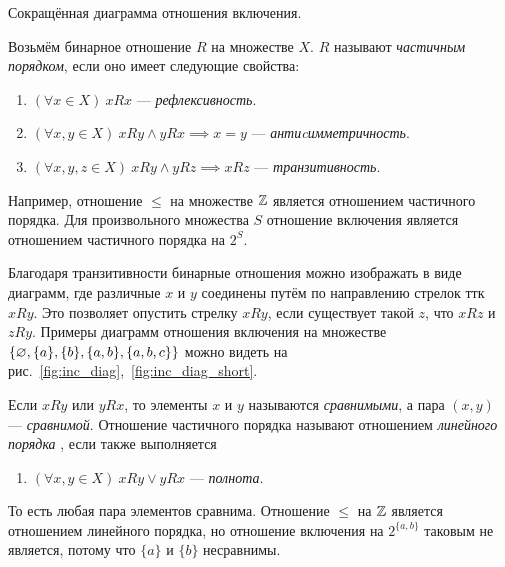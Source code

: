 \begin{marginfigure}
	\center

	\caption{Сокращённая диаграмма отношения включения.}\label{fig:inc_diag_short}
\end{marginfigure}

Возьмём бинарное отношение $R$ на множестве $X$. $R$ называют
{\it частичным порядком},
если оно имеет следующие свойства:
\begin{enumerate}
	\item{}$(\forall x\in X)~xRx$ --- {\it рефлексивность}.
	\item{}$(\forall x,y\in X)~xRy\land yRx\implies x=y$
	--- {\it антиcимметричность}.
	\item{}$(\forall x,y,z\in X)~xRy\land yRz\implies xRz$
	--- {\it транзитивность}.
\end{enumerate}
Например, отношение $\leq$ на множестве $\mathbb Z$ является отношением частичного порядка.
Для произвольного множества $S$ отношение включения является
отношением частичного порядка на $2^{S}$.

Благодаря транзитивности бинарные отношения можно изображать в виде диаграмм, где
различные $x$ и $y$ соединены путём по направлению стрелок ттк $xRy$.
Это позволяет опустить стрелку $xRy$, если существует такой $z$, что $xRz$ и $zRy$.
Примеры диаграмм отношения включения на множестве
$\{\varnothing,\{a\},\{b\},\{a,b\}, \{a,b,c\}\}$
можно видеть на рис.~\ref{fig:inc_diag},~\ref{fig:inc_diag_short}.

Если $xRy$ или $yRx$, то элементы $x$ и $y$ называются
{\it сравнимыми},
а пара $(x,y)$ --- {\it сравнимой}.
Отношение частичного порядка называют отношением {\it линейного порядка}
, если также выполняется
\begin{enumerate}[resume*]
	\item{}$(\forall x,y\in X)~xRy\lor yRx$ --- {\it полнота}.
\end{enumerate}
То есть любая пара элементов сравнима. Отношение $\leq$ на $\mathbb Z$
является отношением линейного порядка,
но отношение включения на $2^{\{a,b\}}$ таковым не является,
потому что $\{a\}$ и $\{b\}$ несравнимы.

